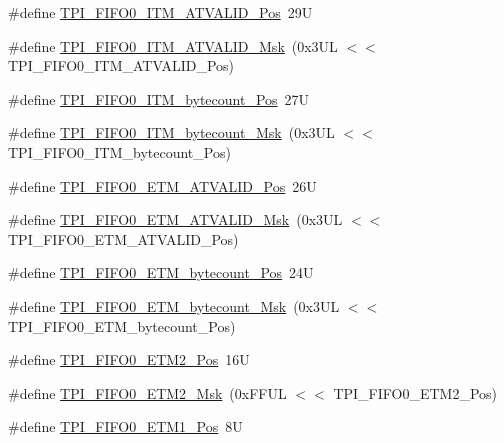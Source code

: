 \begin{DoxyCompactItemize}
\#define \hyperlink{group___c_m_s_i_s___t_p_i_gaa7e050e9eb6528241ebc6835783b6bae}{T\+P\+I\+\_\+\+F\+I\+F\+O0\+\_\+\+I\+T\+M\+\_\+\+A\+T\+V\+A\+L\+I\+D\+\_\+\+Pos}~29U
\item 
\#define \hyperlink{group___c_m_s_i_s___t_p_i_ga94cb2493ed35d2dab7bd4092b88a05bc}{T\+P\+I\+\_\+\+F\+I\+F\+O0\+\_\+\+I\+T\+M\+\_\+\+A\+T\+V\+A\+L\+I\+D\+\_\+\+Msk}~(0x3\+U\+L $<$$<$ T\+P\+I\+\_\+\+F\+I\+F\+O0\+\_\+\+I\+T\+M\+\_\+\+A\+T\+V\+A\+L\+I\+D\+\_\+\+Pos)
\item 
\#define \hyperlink{group___c_m_s_i_s___t_p_i_gac2b6f7f13a2fa0be4aa7645a47dcac52}{T\+P\+I\+\_\+\+F\+I\+F\+O0\+\_\+\+I\+T\+M\+\_\+bytecount\+\_\+\+Pos}~27U
\item 
\#define \hyperlink{group___c_m_s_i_s___t_p_i_ga07bafa971b8daf0d63b3f92b9ae7fa16}{T\+P\+I\+\_\+\+F\+I\+F\+O0\+\_\+\+I\+T\+M\+\_\+bytecount\+\_\+\+Msk}~(0x3\+U\+L $<$$<$ T\+P\+I\+\_\+\+F\+I\+F\+O0\+\_\+\+I\+T\+M\+\_\+bytecount\+\_\+\+Pos)
\item 
\#define \hyperlink{group___c_m_s_i_s___t_p_i_ga7fdeb3e465ca4aa9e3b2f424ab3bbd1d}{T\+P\+I\+\_\+\+F\+I\+F\+O0\+\_\+\+E\+T\+M\+\_\+\+A\+T\+V\+A\+L\+I\+D\+\_\+\+Pos}~26U
\item 
\#define \hyperlink{group___c_m_s_i_s___t_p_i_ga4f0005dc420b28f2369179a935b9a9d3}{T\+P\+I\+\_\+\+F\+I\+F\+O0\+\_\+\+E\+T\+M\+\_\+\+A\+T\+V\+A\+L\+I\+D\+\_\+\+Msk}~(0x3\+U\+L $<$$<$ T\+P\+I\+\_\+\+F\+I\+F\+O0\+\_\+\+E\+T\+M\+\_\+\+A\+T\+V\+A\+L\+I\+D\+\_\+\+Pos)
\item 
\#define \hyperlink{group___c_m_s_i_s___t_p_i_ga2f738e45386ebf58c4d406f578e7ddaf}{T\+P\+I\+\_\+\+F\+I\+F\+O0\+\_\+\+E\+T\+M\+\_\+bytecount\+\_\+\+Pos}~24U
\item 
\#define \hyperlink{group___c_m_s_i_s___t_p_i_gad2536b3a935361c68453cd068640af92}{T\+P\+I\+\_\+\+F\+I\+F\+O0\+\_\+\+E\+T\+M\+\_\+bytecount\+\_\+\+Msk}~(0x3\+U\+L $<$$<$ T\+P\+I\+\_\+\+F\+I\+F\+O0\+\_\+\+E\+T\+M\+\_\+bytecount\+\_\+\+Pos)
\item 
\#define \hyperlink{group___c_m_s_i_s___t_p_i_ga5f0037cc80c65e86d9e94e5005077a48}{T\+P\+I\+\_\+\+F\+I\+F\+O0\+\_\+\+E\+T\+M2\+\_\+\+Pos}~16U
\item 
\#define \hyperlink{group___c_m_s_i_s___t_p_i_gaa82a7b9b99c990fb12eafb3c84b68254}{T\+P\+I\+\_\+\+F\+I\+F\+O0\+\_\+\+E\+T\+M2\+\_\+\+Msk}~(0x\+F\+F\+U\+L $<$$<$ T\+P\+I\+\_\+\+F\+I\+F\+O0\+\_\+\+E\+T\+M2\+\_\+\+Pos)
\item 
\#define \hyperlink{group___c_m_s_i_s___t_p_i_gac5a2ef4b7f811d1f3d81ec919d794413}{T\+P\+I\+\_\+\+F\+I\+F\+O0\+\_\+\+E\+T\+M1\+\_\+\+Pos}~8U
$$
\end{DoxyCompactItemize}
